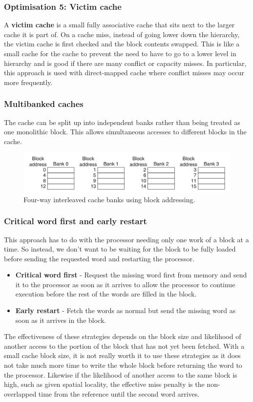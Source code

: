 \documentclass[11pt]{article}
\begin{document}
\subsubsection{Optimisation 5: Victim cache}
A \textbf{victim cache} is a small fully associative cache that sits next to the larger cache it is part of. On a cache miss, instead of going lower down the hierarchy, the victim cache is first checked and the block contents swapped. This is like a small cache for the cache to prevent the need to have to go to a lower level in hierarchy and is good if there are many conflict or capacity misses. In particular, this approach is used with direct-mapped cache where conflict misses may occur more frequently. 

\subsubsection{Multibanked caches}
The cache can be split up into independent banks rather than being treated as one monolithic block. This allows simultaneous accesses to different blocks in the cache. 
\begin{figure}
\centering
\includegraphics[width=1\textwidth, keepaspectratio]{imgs/multibanked-cache.png}
\caption{Four-way interleaved cache banks using block addressing.}
\end{figure}

\subsubsection{Critical word first and early restart}
This approach has to do with the processor needing only one work of a block at a time. So instead, we don't want to be waiting for the block to be fully loaded before sending the requested word and restarting the processor.
\begin{itemize}
\item \textbf{Critical word first} - Request the missing word first from memory and send it to the processor as soon as it arrives to allow the processor to continue execution before the rest of the words are filled in the block.
\item \textbf{Early restart} - Fetch the words as normal but send the missing word as soon as it arrives in the block. 
\end{itemize} 
The effectiveness of these strategies depends on the block size and likelihood of another access to the portion of the block that has not yet been fetched. With a small cache block size, it is not really worth it to use these strategies as it does not take much more time to write the whole block before returning the word to the processor. Likewise if the likelihood of another access to the same block is high, such as given spatial locality, the effective miss penalty is the non-overlapped time from the reference until the second word arrives.
\end{document}
